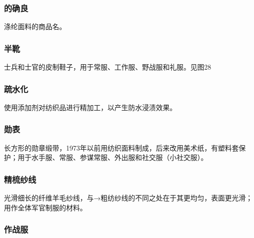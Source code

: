 \subsubsection*{的确良}%

涤纶面料的商品名。

\subsubsection*{半靴}%

士兵和士官的皮制鞋子，用于常服、工作服、野战服和礼服。见图28

\subsubsection*{疏水化}%

使用添加剂对纺织品进行精加工，以产生防水浸渍效果。

\subsubsection*{勋表}%

长方形的勋章缎带，1973年以前用纺织面料制成，后来改用美术纸，有塑料套保护；用于水手服、常服、参谋常服、外出服和社交服（小社交服）。

\subsubsection*{精梳纱线}%

光滑细长的纤维羊毛纱线，与→粗纺纱线的不同之处在于其更均匀，表面更光滑；用作全体军官制服的材料。

\subsubsection*{作战服}%

